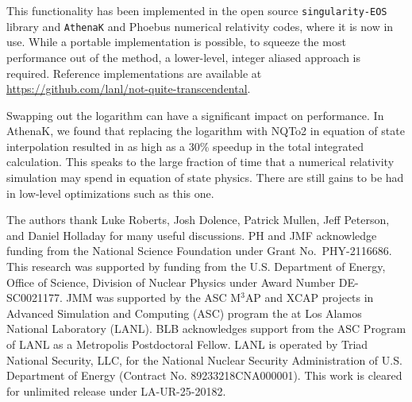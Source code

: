 \documentclass[linenumbers,twocolumn]{aastex631}
\begin{document}
This functionality has been implemented in the open source {\tt singularity-EOS} \citep{singularityeos} library and {\tt AthenaK} \citep{StoneAthenaKBase,Zhu21DustOpacity,Fields24BNS} and Phoebus \citep{Phoebus} numerical relativity codes, where it is now in use. While a portable implementation is possible, to squeeze the most performance out of the method, a lower-level, integer aliased approach is required. Reference implementations are available at \url{https://github.com/lanl/not-quite-transcendental}. 

Swapping out the logarithm can have a significant impact on performance. In AthenaK, we found that replacing the logarithm with NQTo2 in equation of state interpolation resulted in as high as a 30\% speedup in the total integrated calculation. This speaks to the large fraction of time that a numerical relativity simulation may spend in equation of state physics. There are still gains to be had in low-level optimizations such as this one.

\begin{acknowledgments}
The authors thank Luke Roberts, Josh Dolence, Patrick Mullen, Jeff Peterson, and Daniel Holladay for many useful discussions. PH and JMF acknowledge funding from the National Science Foundation under Grant No.~PHY-2116686. This research was supported by funding from the U.S. Department of Energy, Office of Science, Division of Nuclear Physics under Award Number DE-SC0021177. JMM was supported by the ASC M$^3$AP and XCAP projects in Advanced Simulation and Computing (ASC) program the at Los Alamos National Laboratory (LANL). 
BLB acknowledges support from the ASC Program of LANL as a Metropolis Postdoctoral Fellow.
LANL is operated by Triad National Security, LLC, for the National Nuclear Security Administration of U.S. Department of Energy (Contract No. 89233218CNA000001). This work is cleared for unlimited release under LA-UR-25-20182.
\end{acknowledgments}


\end{document}

